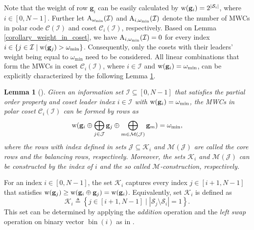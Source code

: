 \documentclass[12pt, draftclsnofoot, peerreview, onecolumn]{IEEEtran}
\theoremstyle{noparent}
\newtheorem{lemma}[theorem]{\textbf{Lemma}}
\DeclareMathOperator\bin{bin}
\begin{document}
Note that the weight of row $\mathbf{g}_i$
can be easily calculated by ${\rm w}(\mathbf{g}_i)=2^{|\mathcal{S}_i|}$, where $i\in[0,N-1]$.
Further let ${\rm A}_{\omega_{\min}}(\mathcal{I})$ and 
${\rm A}_{i, \omega_{\min}}(\mathcal{I})$ denote 
the number of MWCs in polar code $\mathcal{C}(\mathcal{I})$ and 
coset $\mathcal{C}_i(\mathcal{I})$, respectively.
Based on Lemma \ref{corollary_weight_in_coset},
we have ${\rm A}_{i, \omega_{\min}}(\mathcal{I})=0$
for every index $i\in\{j\in\mathcal{I} \mid {\rm w}({\bf g}_j)>\omega_{\min}\}$.
Consequently, only the cosets with 
their leaders' weight being equal to $\omega_{\min}$ need to be considered.
All linear combinations that form the MWCs in coset
$\mathcal{C}_i(\mathcal{I})$,
where $i\in \mathcal{I}$ and ${\rm w}({\bf g}_i)=\omega_{\min}$, 
can be explicitly characterized by the following
Lemma \ref{proposi_Polar_form}.

\begin{lemma}[\cite{Rowshan2023FormationMinweight,Bardet2016Algebraicpropertiespolar_conf}]
    \label{proposi_Polar_form}
    Given an information set $\mathcal{I} \subseteq [0,N-1]$ that satisfies the partial order property
    and coset leader index $i \in \mathcal{I}$ with ${\rm w}(\mathbf{g}_i)=\omega_{\min}$,
    the MWCs in polar coset $\mathcal{C}_i(\mathcal{I})$ can be formed 
    by rows as 
    \begin{equation}
        \label{polar_MWC_form}
        {\rm w}(\mathbf{g}_i \oplus \bigoplus_{j \in \mathcal{J}} \mathbf{g}_j \oplus \bigoplus_{m \in \mathcal{M}(\mathcal{J})} \mathbf{g}_m)=\omega_{\min},
    \end{equation}
    where the rows with index defined in sets $\mathcal{J}\subseteq \mathcal{K}_i$ and 
    $\mathcal{M}(\mathcal{J})$ are called the core rows and the balancing rows, respectively.
    Moreover, the sets $\mathcal{K}_i$ and $\mathcal{M}(\mathcal{J})$ can be constructed by
    the index of $i$ and the so called $\mathcal{M}$-construction, respectively.
\end{lemma}




For an index $i\in[0,N-1]$, the set $\mathcal{K}_{i}$ captures every index $j\in[i+1, N-1]$
that satisfies ${\rm w}(\mathbf{g}_j)\geq{\rm w}(\mathbf{g}_i\oplus\mathbf{g}_j)={\rm w}(\mathbf{g}_i)$.
Equivalently, set $\mathcal{K}_{i}$ is defined as 
\begin{equation}
\label{Ki_definition}
\mathcal{K}_i\triangleq \left\{ j\in \left[ i+1,N-1 \right]  \mid  |\mathcal{S}_j\setminus \mathcal{S}_i|=1 \right\}.
\end{equation} 
This set can be determined by applying the \textit{addition} operation and the \textit{left swap} operation on binary vector
$\bin(i)$ as in \cite{Rowshan2023FormationMinweight}.
\end{document}
